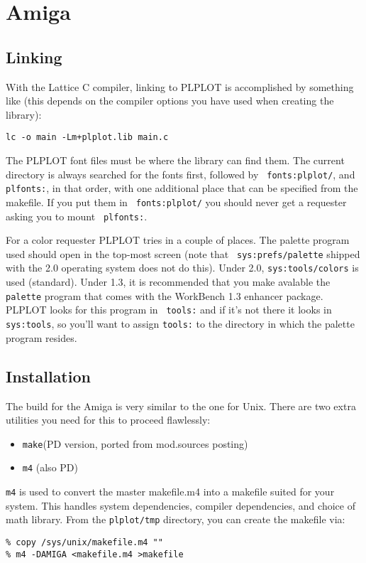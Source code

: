 \section{Amiga}

\subsection{Linking}

With the Lattice C compiler, linking to PLPLOT is accomplished by something
like (this depends on the compiler options you have used when creating the
library):
\begin{verbatim}
lc -o main -Lm+plplot.lib main.c
\end{verbatim}

The PLPLOT font files must be where the library can find them.  The current
directory is always searched for the fonts first, followed by {\tt
fonts:plplot/}, and {\tt plfonts:}, in that order, with one additional place
that can be specified from the makefile.  If you put them in {\tt
fonts:plplot/} you should never get a requester asking you to mount {\tt
plfonts:}.

For a color requester PLPLOT tries in a couple of places.  The palette
program used should open in the top-most screen (note that {\tt
sys:prefs/palette} shipped with the 2.0 operating system does not do this).
Under 2.0, {\tt sys:tools/colors} is used (standard).  Under 1.3, it is
recommended that you make avalable the {\tt palette} program that comes with
the WorkBench 1.3 enhancer package.  PLPLOT looks for this program in {\tt
tools:} and if it's not there it looks in {\tt sys:tools}, so you'll want to
assign {\tt tools:} to the directory in which the palette program resides.

\subsection{Installation}

The build for the Amiga is very similar to the one for Unix.  There are two
extra utilities you need for this to proceed flawlessly:
\begin{itemize}
\item	{\tt make}\qquad (PD version, ported from mod.sources posting)
\item	{\tt m4}  \qquad (also PD)
\end{itemize}

{\tt m4} is used to convert the master makefile.m4 into a makefile suited
for your system.  This handles system dependencies, compiler dependencies,
and choice of math library.  From the {\tt plplot/tmp} directory, you can
create the makefile via:
\begin{verbatim}
% copy /sys/unix/makefile.m4 ""
% m4 -DAMIGA <makefile.m4 >makefile
\end{verbatim}

